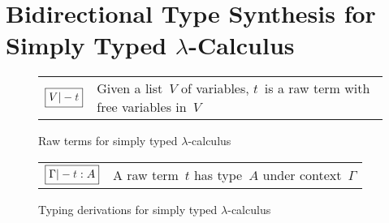 
\section{Bidirectional Type Synthesis for Simply Typed \texorpdfstring{$\lambda$}{λ}-Calculus} \label{sec:key-ideas}

\begin{figure}
  \small
  \bgroup
  \renewcommand{\arraystretch}{1.5}
  \begin{tabular}{ r l }
    $\boxed{V |- \isTerm{t}}$ & Given a list~$V$ of variables, $t$~is a raw term with free variables in~$V$
  \end{tabular}
  \egroup
  \centering
  \caption{Raw terms for simply typed $\lambda$-calculus}
  \label{fig:STLC-raw-terms}
\end{figure}

\begin{figure}
  \small
  \bgroup
  \renewcommand{\arraystretch}{1.5}
  \begin{tabular}{ r l }
    $\boxed{\Gamma |- \isTerm{t} : A}$ & A raw term~$t$ has type~$A$ under context~$\Gamma$
  \end{tabular}
  \egroup
  \centering
  \caption{Typing derivations for simply typed $\lambda$-calculus}
  \label{fig:STLC-typing-derivations}
\end{figure}

